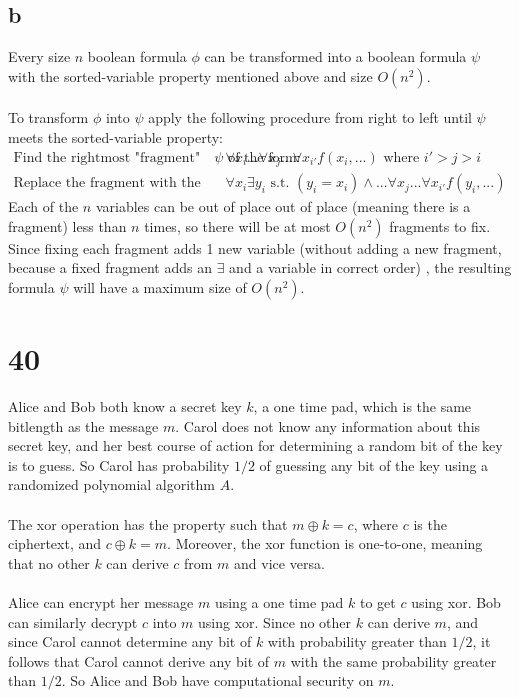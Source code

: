 \documentclass[letterpaper,notitlepage,twoside]{article}
\begin{document}
\subsection*{b}
Every size $n$ boolean formula $\phi$ can be transformed into a boolean formula $\psi$ with the sorted-variable property mentioned above and size $O(n^2)$.
\\\\
To transform $\phi$ into $\psi$ apply the following procedure from right to left until $\psi$ meets the sorted-variable property:
\begin{align*}
\text{Find the rightmost "fragment" of } \psi \text{ of the form: }& \forall x_i ... \forall x_j ... \forall x_{i'} f(x_i,...) \text{ where } i' > j > i \\
\text{Replace the fragment with the following: }& \forall x_i \exists y_i \text{ s.t. } (y_i=x_i) \land ... \forall x_j ... \forall x_{i'} f(y_i,...)
\end{align*}
Each of the $n$ variables can be out of place out of place (meaning there is a fragment) less than $n$ times, so there will be at most $O(n^2)$ fragments to fix. Since fixing each fragment adds 1 new variable (without adding a new fragment, because a fixed fragment adds an $\exists$ and a variable in correct order) , the resulting formula $\psi$ will have a maximum size of $O(n^2)$. 

\section*{40}
Alice and Bob both know a secret key $k$, a one time pad, which is the same bitlength as the message $m$.
Carol does not know any information about this secret key, and her best course of action for determining a random bit of the key is to guess.
So Carol has probability $1/2$ of guessing any bit of the key using a randomized polynomial algorithm $A$. \\\\
The xor operation has the property such that $m \oplus k = c$, where $c$ is the ciphertext, and $c \oplus k = m$. Moreover, the xor function is one-to-one, meaning that no other $k$ can derive $c$ from $m$ and vice versa. \\\\
Alice can encrypt her message $m$ using a one time pad $k$ to get $c$ using xor. Bob can similarly decrypt $c$ into $m$ using xor.
Since no other $k$ can derive $m$, and since Carol cannot determine any bit of $k$ with probability greater than $1/2$, it follows that Carol cannot derive any bit of $m$ with the same probability greater than $1/2$.
So Alice and Bob have computational security on $m$.
\end{document}
